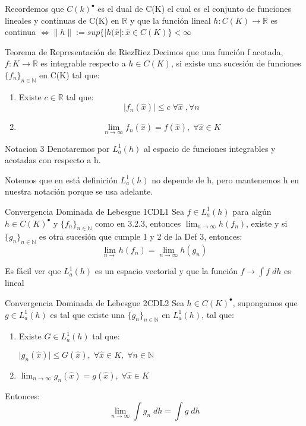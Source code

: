 \documentclass[12pt,a4paper]{book}
\providecommand{\abs}[1]{\lvert#1\rvert}
\providecommand{\norm}[1]{\lVert#1\rVert}
\providecommand{\conj}[1]{\lbrace#1\rbrace}
\providecommand{\Lah}{L_{a}^{1}(h)}
\begin{document}
Recordemos que $C(k)^{\bullet}$ es el dual de C(K) el cual es el conjunto de funciones lineales y continuas de C(K) en $\mathbb{R}$ y que la función lineal $h:C(K)\rightarrow\mathbb{R}$ es continua $\Leftrightarrow \norm{h}:=sup\conj{\abs{h(\widehat{x}}:\widehat{x}\in C(K)}<\infty$ 
\smallskip

\begin{definicion}{Teorema de Representación de Riez}{Riez}
Decimos que una función f acotada, $f:K\rightarrow \mathbb{R}$ es integrable respecto a $h\in C(K)$, si existe una sucesión de funciones $\conj{f_{n}}_{n\in\mathbb{N}}$ en C(K) tal que:
\begin{enumerate}
\item Existe $c\in\mathbb{R}$ tal que:
$$\abs{f_{n}(\widehat{x})}\leq c\;\forall\widehat{x}\;,\forall n$$
\item $$\lim_{n\rightarrow\infty} f_{n}(\widehat{x})=f(\widehat{x}),\; \forall \widehat{x}\in K$$
\end{enumerate}
\end{definicion}
\smallskip

\begin{notacion}{}{Notacion 3}
Denotaremos por $L_{a}^{1}(h)$ al espacio de funciones integrables y acotadas con respecto a h.
\end{notacion}
\smallskip

Notemos que en está definición $L_{a}^{1}(h)$ no depende de h, pero mantenemos h en nuestra notación porque se usa adelante.
\smallskip

\begin{teorema}{Convergencia Dominada de Lebesgue 1}{CDL1}
Sea $f\in L_{a}^{1}(h)$ para algún $h\in C(K)^{\bullet}$ y $\conj{f_{n}}_{n\in\mathbb{N}}$ como en 3.2.3, entonces $\lim_{n\rightarrow\infty}h(f_{n})$, existe y si $\conj{g_{n}}_{n\in\mathbb{N}}$ es otra sucesión que cumple 1 y 2 de la Def 3, entonces:
$$\lim_{n\rightarrow}h(f_{n})=\lim_{n\rightarrow\infty}h(g_{n})$$
\end{teorema} 
\smallskip

Es fácil ver que $\Lah$ es un espacio vectorial y que la función $f\rightarrow \int f\;dh$ es lineal
\smallskip

\begin{teorema}{Convergencia Dominada de Lebesgue 2}{CDL2}
Sea $h\in C(K)^{\bullet}$, supongamos que $g\in \Lah$ es tal que existe una $\conj{g_{n}}_{n\in\mathbb{N}}$ en $\Lah$, tal que:
\begin{enumerate}
\item Existe $G\in\Lah$ tal que:
\begin{center}
$\abs{g_{n}(\widehat{x})}\leq G(\widehat{x}),\;\forall\widehat{x}\in K,\;\forall n\in\mathbb{N}$
\end{center} 
\item $\lim_{n\rightarrow\infty}g_{n}(\widehat{x})=g(\widehat{x}),\;\forall\widehat{x}\in K$
\end{enumerate}
Entonces:
$$\lim_{n\rightarrow\infty}\int g_{n}\;dh=\int g\;dh$$
\end{teorema}
\smallskip
\end{document}
